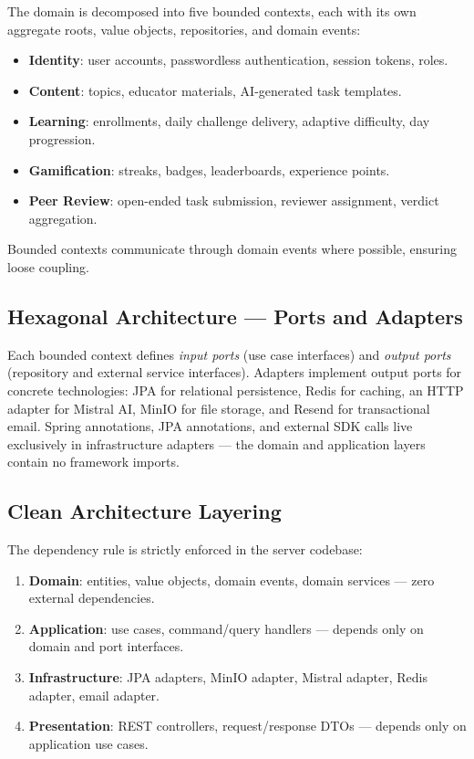 The domain is decomposed into five bounded contexts, each with its own aggregate roots, value objects, repositories, and domain events:

\begin{itemize}
    \item \textbf{Identity}: user accounts, passwordless authentication, session tokens, roles.
    \item \textbf{Content}: topics, educator materials, AI-generated task templates.
    \item \textbf{Learning}: enrollments, daily challenge delivery, adaptive difficulty, day progression.
    \item \textbf{Gamification}: streaks, badges, leaderboards, experience points.
    \item \textbf{Peer Review}: open-ended task submission, reviewer assignment, verdict aggregation.
\end{itemize}

Bounded contexts communicate through domain events where possible, ensuring loose coupling.

\subsection{Hexagonal Architecture — Ports and Adapters}
\label{ssec:hex_impl}

Each bounded context defines \emph{input ports} (use case interfaces) and \emph{output ports} (repository and external service interfaces). Adapters implement output ports for concrete technologies: JPA for relational persistence, Redis for caching, an HTTP adapter for Mistral AI, MinIO for file storage, and Resend for transactional email. Spring annotations, JPA annotations, and external SDK calls live exclusively in infrastructure adapters — the domain and application layers contain no framework imports.

\subsection{Clean Architecture Layering}
\label{ssec:clean_impl}

The dependency rule is strictly enforced in the server codebase:

\begin{enumerate}
    \item \textbf{Domain}: entities, value objects, domain events, domain services — zero external dependencies.
    \item \textbf{Application}: use cases, command/query handlers — depends only on domain and port interfaces.
    \item \textbf{Infrastructure}: JPA adapters, MinIO adapter, Mistral adapter, Redis adapter, email adapter.
    \item \textbf{Presentation}: REST controllers, request/response DTOs — depends only on application use cases.
\end{enumerate}

